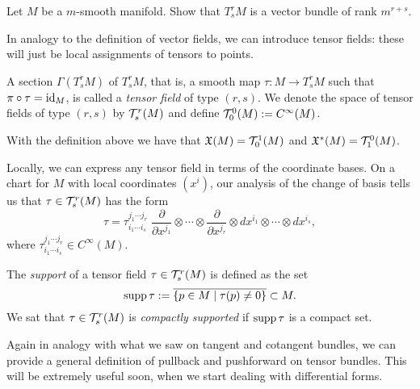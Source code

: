 \begin{exercise}
  Let $M$ be a $m$-smooth manifold.
  Show that $T^r_sM$ is a vector bundle of rank $m^{r+s}$.
\end{exercise}

In analogy to the definition of vector fields, we can introduce tensor fields: these will just be local assignments of tensors to points.

\begin{definition}
  A section $\Gamma(T_s^r M)$ of $T_s^r M$, that is, a smooth map $\tau : M \to T_s^r M$ such that $\pi\circ \tau = \operatorname{id}_M$, is called a \emph{tensor field} of type $(r,s)$.
  We denote the space of tensor fields of type $(r,s)$ by $\mathcal{T}_s^r(M)$ and define $\mathcal{T}_0^0(M) := C^\infty(M)$.
\end{definition}

\begin{example}
  With the definition above we have that $\mathfrak{X}(M) = \mathcal{T}_0^1(M)$ and $\mathfrak{X}^*(M) = \mathcal{T}_1^0(M)$.
\end{example}

Locally, we can express any tensor field in terms of the coordinate bases.
On a chart for $M$ with local coordinates $(x^i)$, our analysis of the change of basis tells us that $\tau\in\mathcal{T}_s^r(M)$ has the form
\begin{equation}
  \tau = \tau^{j_1\cdots j_r}_{i_1\cdots i_s}\; \frac{\partial}{\partial x^{j_1}}\otimes\cdots\otimes\frac{\partial}{\partial x^{j_r}}\otimes dx^{i_1}\otimes\cdots\otimes dx^{i_s},
\end{equation}
where $\tau^{j_1\cdots j_r}_{i_1\cdots i_s}\in C^\infty(M)$.

\begin{definition}
  The \emph{support} of a tensor field $\tau\in\mathcal{T}_s^r(M)$ is defined as the set
  \begin{equation}
    \operatorname{supp} \tau := \overline{\{p\in M\mid \tau(p) \neq 0\}} \subset M.
  \end{equation}
  We sat that $\tau\in\mathcal{T}_s^r(M)$ is \emph{compactly supported} if $\operatorname{supp}\tau$ is a compact set.
\end{definition}

Again in analogy with what we saw on tangent and cotangent bundles, we can provide a general definition of pullback and pushforward on tensor bundles.
This will be extremely useful soon, when we start dealing with differential forms.

